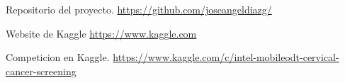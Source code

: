 % 

\begin{thebibliography}{99}

	\emph{} Repositorio del proyecto. \url{https://github.com/joseangeldiazg/}

	\emph{} Website de Kaggle \url{https://www.kaggle.com}	

	\emph{} Competicion en Kaggle. \url{https://www.kaggle.com/c/intel-mobileodt-cervical-cancer-screening}
		
		
\end{thebibliography}
